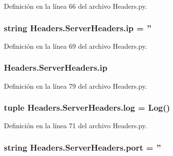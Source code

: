 Definición en la línea 66 del archivo Headers.\-py.

\hypertarget{class_headers_1_1_server_headers_ad49c893c7978250dad3f16542da29604}{
\subsubsection[{ip}]{\setlength{\rightskip}{0pt plus 5cm}string Headers.\-Server\-Headers.\-ip = ''\hspace{0.3cm}{\ttfamily [static]}}}\label{class_headers_1_1_server_headers_ad49c893c7978250dad3f16542da29604}


Definición en la línea 69 del archivo Headers.\-py.

\hypertarget{class_headers_1_1_server_headers_a9e689b58646145828e47075285a01dfd}{
\subsubsection[{ip}]{\setlength{\rightskip}{0pt plus 5cm}Headers.\-Server\-Headers.\-ip}}\label{class_headers_1_1_server_headers_a9e689b58646145828e47075285a01dfd}


Definición en la línea 79 del archivo Headers.\-py.

\hypertarget{class_headers_1_1_server_headers_ac737ac570426a0a45fa1276e25a95a82}{
\subsubsection[{log}]{\setlength{\rightskip}{0pt plus 5cm}tuple Headers.\-Server\-Headers.\-log = {\bf Log}()\hspace{0.3cm}{\ttfamily [static]}}}\label{class_headers_1_1_server_headers_ac737ac570426a0a45fa1276e25a95a82}


Definición en la línea 71 del archivo Headers.\-py.

\hypertarget{class_headers_1_1_server_headers_aca611671864297dbaf364e18ad40837a}{
\subsubsection[{port}]{\setlength{\rightskip}{0pt plus 5cm}string Headers.\-Server\-Headers.\-port = ''\hspace{0.3cm}{\ttfamily [static]}}}\label{class_headers_1_1_server_headers_aca611671864297dbaf364e18ad40837a}


